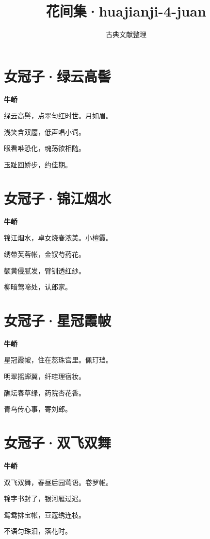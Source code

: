 \documentclass[12pt,a4paper]{ctexbook}
\title{花间集·huajianji-4-juan}
\author{古典文献整理}
\date{}
\begin{document}
\maketitle
\tableofcontents
\newpage
\section{女冠子·绿云高髻}
\textbf{牛峤}\par\vspace{0.5em}
绿云高髻，点翠匀红时世。月如眉。\par
浅笑含双靥，低声唱小词。\par
眼看唯恐化，魂荡欲相随。\par
玉趾回娇步，约佳期。\par

\section{女冠子·锦江烟水}
\textbf{牛峤}\par\vspace{0.5em}
锦江烟水，卓女烧春浓美。小檀霞。\par
绣带芙蓉帐，金钗芍药花。\par
额黄侵腻发，臂钏透红纱。\par
柳暗莺啼处，认郎家。\par

\section{女冠子·星冠霞帔}
\textbf{牛峤}\par\vspace{0.5em}
星冠霞帔，住在蕊珠宫里。佩玎珰。\par
明翠摇蝉翼，纤珪理宿妆。\par
醮坛春草绿，药院杏花香。\par
青鸟传心事，寄刘郎。\par

\section{女冠子·双飞双舞}
\textbf{牛峤}\par\vspace{0.5em}
双飞双舞，春昼后园莺语。卷罗帷。\par
锦字书封了，银河雁过迟。\par
鸳鸯排宝帐，豆蔻绣连枝。\par
不语匀珠泪，落花时。\par
\end{document}
